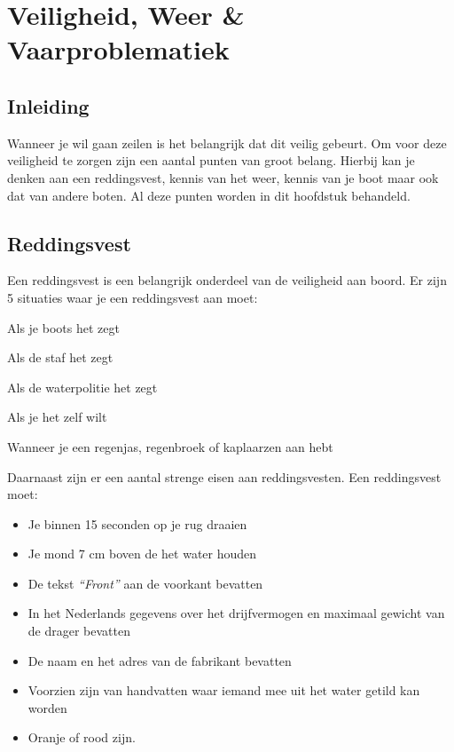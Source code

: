 \chapter{Veiligheid, Weer \& Vaarproblematiek}
\section{Inleiding}
Wanneer je wil gaan zeilen is het belangrijk dat dit veilig gebeurt. Om voor deze veiligheid te zorgen zijn een aantal punten van groot belang. Hierbij kan je denken aan een reddingsvest, kennis van het weer, kennis van je boot maar ook dat van andere boten. Al deze punten worden in dit hoofdstuk behandeld.
\section{Reddingsvest}
Een reddingsvest is een belangrijk onderdeel van de veiligheid aan boord. Er zijn 5 situaties waar je een reddingsvest aan moet:
\begin{enumerate}
\begin{multicols}{2}
    \item Als je boots het zegt
    \item Als de staf het zegt
    \item Als de waterpolitie het zegt 
    \item Als je het zelf wilt 
    \item Wanneer je een regenjas, regenbroek of kaplaarzen aan hebt
\end{multicols}
\end{enumerate}
Daarnaast zijn er een aantal strenge eisen aan reddingsvesten. Een reddingsvest moet:
\begin{itemize}
    \item Je binnen 15 seconden op je rug draaien
    \item Je mond 7 cm boven de het water houden
    \item De tekst \textit{``Front''} aan de voorkant bevatten
    \item In het Nederlands gegevens over het drijfvermogen en maximaal gewicht van de drager bevatten
    \item De naam en het adres van de fabrikant bevatten
    \item Voorzien zijn van handvatten waar iemand mee uit het water getild kan worden
    \item Oranje of rood zijn.
\end{itemize}

